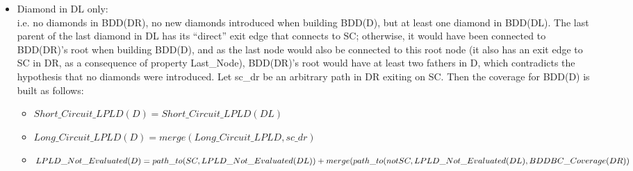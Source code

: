 \documentclass[a4paper,12pt,twoside]{article}
\begin{document}
\begin{description}
\begin{itemize}
    Then the coverage for BDD(D) is built as follows:
    \begin{itemize}
    \item $Short\_Circuit\_LPLD(D) = SC\_DL$
    \item $Long\_Circuit\_LPLD(D)  = merge(LC\_DL, {sc\_dr})$
    \item $LPLD\_Not\_Evaluated(D) = path\_to(SC, REST\_DL)\\
                            + merge(path\_to(not SC), REST\_DL),\\
                            BDDBC\_Coverage(DR))$
    \end{itemize}
    (Note that we are allowed to merge path\_to(not SC, REST\_DL) because
    it is non-empty; there is at least one other node that has an exit
    edge directly connected to ``not SC'' in BDD(DL), otherwise no
    diamond would have been created; so it must have at least one path
    that does not evaluate the last node in BDD(DL); that property
    gives us the right to use the merge operation. Same thing for LC\_DL
    and SC\_DL that are both non-empty thanks to Last\_Node property).

  \item Diamond in DL only:\\
    i.e. no diamonds in BDD(DR), no new diamonds introduced when
    building BDD(D), but at least one diamond in BDD(DL).  The last
    parent of the last diamond in DL has its ``direct'' exit edge
    that connects to SC; otherwise, it would have been connected to
    BDD(DR)'s root when building BDD(D), and as the last node would
    also be connected to this root node (it also has an exit edge to
    SC in DR, as a consequence of property Last\_Node), BDD(DR)'s
    root would have at least two fathers in D, which contradicts the
    hypothesis that no diamonds were introduced.  Let sc\_dr be an
    arbitrary path in DR exiting on SC.  Then the coverage for BDD(D)
    is built as follows:
    \begin{itemize}
    \item $Short\_Circuit\_LPLD(D) = Short\_Circuit\_LPLD(DL)$
    \item $Long\_Circuit\_LPLD(D)  = merge(Long\_Circuit\_LPLD, {sc\_dr})$
    \item $LPLD\_Not\_Evaluated(D) = path\_to(SC, LPLD\_Not\_Evaluated(DL))\\
                           + merge(path\_to(not SC, LPLD\_Not\_Evaluated(DL),\\
                           BDDBC\_Coverage(DR))$
    \end{itemize}
  \end{itemize}
\end{description}
\end{document}
